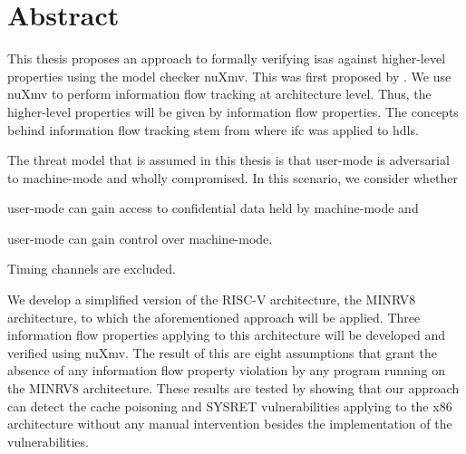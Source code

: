 \chapter*{\centering Abstract}

This thesis proposes an approach to formally verifying \glspl{isa} against higher-level properties using the model checker nuXmv.
This was first proposed by \cite{Reid17}.
We use nuXmv to perform information flow tracking at architecture level.
Thus, the higher-level properties will be given by information flow properties.
The concepts behind information flow tracking stem from \cite{Ferraiuolo17} where \gls{ifc} was applied to \glspl{hdl}.

The threat model that is assumed in this thesis is that user-mode is adversarial to machine-mode and wholly compromised.
In this scenario, we consider whether
\begin{enumerate*}[label=\alph*)]
    \item user-mode can gain access to confidential data held by machine-mode and
    \item user-mode can gain control over machine-mode.
\end{enumerate*}
Timing channels are excluded.

We develop a simplified version of the RISC-V architecture, the MINRV8 architecture, to which the aforementioned approach will be applied.
Three information flow properties applying to this architecture will be developed and verified using nuXmv.
The result of this are eight assumptions that grant the absence of any information flow property violation by any program running on the MINRV8 architecture.
These results are tested by showing that our approach can detect the cache poisoning \cite{Wojtczuk09} and SYSRET vulnerabilities \cite{SYSRET-vuln,Dunlap19} applying to the x86 architecture without any manual intervention besides the implementation of the vulnerabilities.
